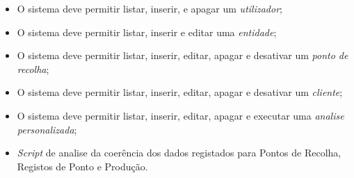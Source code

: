 \begin{itemize}
	\item O sistema deve permitir listar, inserir, e apagar um \textit{utilizador};
	\item O sistema deve permitir listar, inserir e editar uma \textit{entidade};
	\item O sistema deve permitir listar, inserir, editar, apagar e desativar um \textit{ponto de recolha};
	\item O sistema deve permitir listar, inserir, editar, apagar e desativar um \textit{cliente};
	\item O sistema deve permitir listar, inserir, editar, apagar e executar uma \textit{analise personalizada};
	\item \textit{Script} de analise da coerência dos dados registados para Pontos de Recolha, Registos de Ponto e Produção.
\end{itemize}
